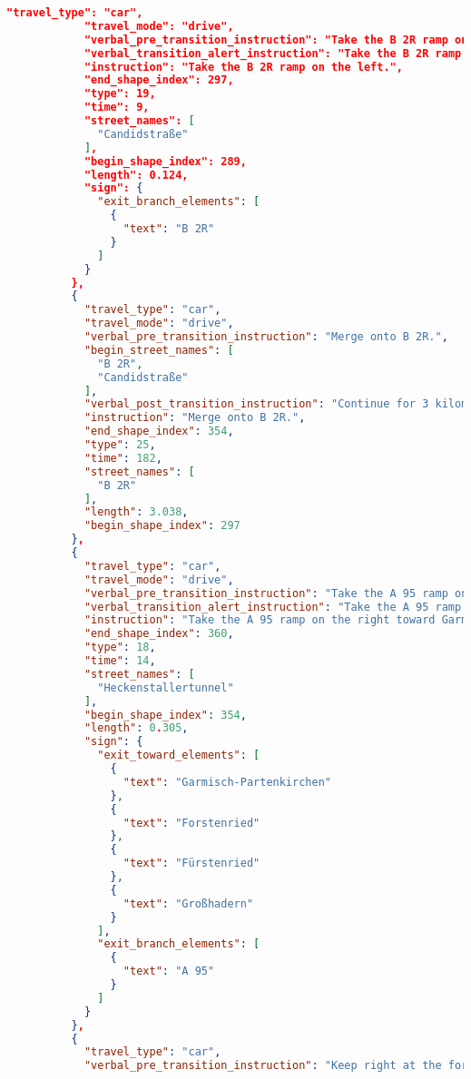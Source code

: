 \begin{lstlisting}[language=json,breaklines=true]
            "travel_type": "car",
            "travel_mode": "drive",
            "verbal_pre_transition_instruction": "Take the B 2R ramp on the left.",
            "verbal_transition_alert_instruction": "Take the B 2R ramp on the left.",
            "instruction": "Take the B 2R ramp on the left.",
            "end_shape_index": 297,
            "type": 19,
            "time": 9,
            "street_names": [
              "Candidstraße"
            ],
            "begin_shape_index": 289,
            "length": 0.124,
            "sign": {
              "exit_branch_elements": [
                {
                  "text": "B 2R"
                }
              ]
            }
          },
          {
            "travel_type": "car",
            "travel_mode": "drive",
            "verbal_pre_transition_instruction": "Merge onto B 2R.",
            "begin_street_names": [
              "B 2R",
              "Candidstraße"
            ],
            "verbal_post_transition_instruction": "Continue for 3 kilometers.",
            "instruction": "Merge onto B 2R.",
            "end_shape_index": 354,
            "type": 25,
            "time": 182,
            "street_names": [
              "B 2R"
            ],
            "length": 3.038,
            "begin_shape_index": 297
          },
          {
            "travel_type": "car",
            "travel_mode": "drive",
            "verbal_pre_transition_instruction": "Take the A 95 ramp on the right toward Garmisch-Partenkirchen, Forstenried.",
            "verbal_transition_alert_instruction": "Take the A 95 ramp on the right.",
            "instruction": "Take the A 95 ramp on the right toward Garmisch-Partenkirchen/Forstenried/Fürstenried/Großhadern.",
            "end_shape_index": 360,
            "type": 18,
            "time": 14,
            "street_names": [
              "Heckenstallertunnel"
            ],
            "begin_shape_index": 354,
            "length": 0.305,
            "sign": {
              "exit_toward_elements": [
                {
                  "text": "Garmisch-Partenkirchen"
                },
                {
                  "text": "Forstenried"
                },
                {
                  "text": "Fürstenried"
                },
                {
                  "text": "Großhadern"
                }
              ],
              "exit_branch_elements": [
                {
                  "text": "A 95"
                }
              ]
            }
          },
          {
            "travel_type": "car",
            "verbal_pre_transition_instruction": "Keep right at the fork. Then Bear right onto Luise-Kiesselbach-Platz.",

\end{lstlisting}
